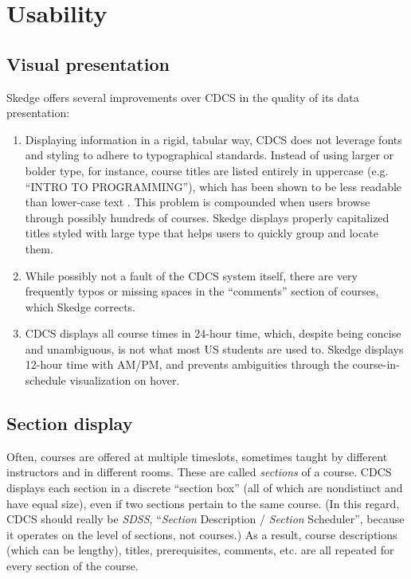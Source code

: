 
\section{Usability}

\subsection{Visual presentation}

Skedge offers several improvements over CDCS in the quality of its data presentation:

\begin{enumerate}
  \item Displaying information in a rigid, tabular way, CDCS does not leverage fonts and styling to adhere to typographical standards. Instead of using larger or bolder type, for instance, course titles are listed entirely in uppercase (e.g. ``INTRO TO PROGRAMMING''), which has been shown to be less readable than lower-case text \cite{caps}. This problem is compounded when users browse through possibly hundreds of courses. Skedge displays properly capitalized titles styled with large type that helps users to quickly group and locate them.

  \item While possibly not a fault of the CDCS system itself, there are very frequently typos or missing spaces in the ``comments'' section of courses, which Skedge corrects.

  \item CDCS displays all course times in 24-hour time, which, despite being concise and unambiguous, is not what most US students are used to. Skedge displays 12-hour time with AM/PM, and prevents ambiguities through the course-in-schedule visualization on hover.
\end{enumerate}

\subsection{Section display}

Often, courses are offered at multiple timeslots, sometimes taught by different instructors and in different rooms. These are called \emph{sections} of a course. CDCS displays each section in a discrete ``section box'' (all of which are nondistinct and have equal size), even if two sections pertain to the same course. (In this regard, CDCS should really be \emph{SDSS}, ``\emph{Section} Description / \emph{Section} Scheduler'', because it operates on the level of sections, not courses.) As a result, course descriptions (which can be lengthy), titles, prerequisites, comments, etc. are all repeated for every section of the course.

